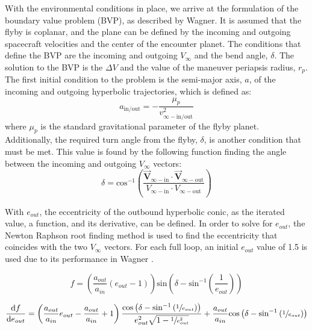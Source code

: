 \documentclass[letterpaper, paper,11pt]{AAS}	%
\begin{document}
With the environmental conditions in place, we arrive at the formulation of the boundary value problem (BVP), as described by Wagner\cite{Wagner2015}. It is assumed that the flyby is coplanar, and the plane can be defined by the incoming and outgoing spacecraft velocities and the center of the encounter planet. The conditions that define the BVP are the incoming and outgoing $V_\infty$ and the bend angle, $\delta$. The solution to the BVP is the $\Delta V$ and the value of the maneuver periapsis radius, $r_p$. The first initial condition to the problem is the semi-major axis, $a$, of the incoming and outgoing hyperbolic trajectories, which is defined as:
\begin{equation}
    a_\text{in/out} = -\frac{\mu_p}{v^2_{\infty-\text{in/out}}}
\end{equation}
\noindent where $\mu_p$ is the standard gravitational parameter of the flyby planet. Additionally, the required turn angle from the flyby, $\delta$, is another condition that must be met. This value is found by the following function finding the angle between the incoming and outgoing $V_\infty$ vectors:
\begin{equation}
    \delta = \text{cos}^{-1}\left(\frac{ \vec{\textbf{V}}_{\infty-\text{in}} \cdot \vec{\textbf{V}}_{\infty-\text{out}} }{ V_{\infty-\text{in}} \cdot V_{\infty-\text{out}} }\right)
\end{equation}

With $e_{out}$, the eccentricity of the outbound hyperbolic conic, as the iterated value, a function, and its derivative, can be defined. In order to solve for $e_{out}$, the Newton Raphson root finding method is used to find the eccentricity that coincides with the two $V_\infty$ vectors. For each full loop, an initial $e_{out}$ value of 1.5 is used due to its performance in Wagner \cite{Wagner2015}.

\begin{equation}
    f = \left( \frac{a_{out}}{a_{in}} (e_{out} - 1) \right) \text{sin} \left( \delta - \text{sin}^{-1} \left( \frac{1}{e_{out}} \right) \right)
\end{equation}

\begin{equation}
    \frac{\text{d}f}{\text{d}e_{out}} = \left( \frac{a_{out}}{a_{in}}e_{out} - \frac{a_{out}}{a_{in}} + 1 \right) \frac{ \text{cos}\left( \delta - \text{sin}^{-1} \left( \sfrac{1}{e_{out}} \right) \right) }{ e_{out}^{2} \sqrt{1 - \sfrac{1}{e_{out}^{2}} } } + \frac{a_{out}}{a_{in}}\text{cos}\left( \delta - \text{sin}^{-1} \left( \sfrac{1}{e_{out}} \right) \right)
\end{equation}
\end{document}
